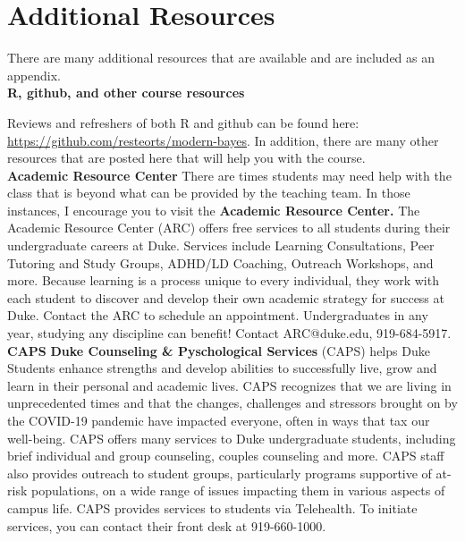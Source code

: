 \documentclass[11pt]{article}
\begin{document}
\clearpage
\newpage
\appendix

\section{Additional Resources}
There are many additional resources that are available and are included as an appendix. \\

\textbf{R, github, and other course resources}

Reviews and refreshers of both R and github can be found here: \url{https://github.com/resteorts/modern-bayes}. In addition, there are many other resources that are posted here that will help you with the course. \\


\textbf{Academic Resource Center} There are times students may need help with the class that is beyond what can be provided by the teaching team. In those instances, I encourage you to visit the \textbf{Academic Resource Center.} The Academic Resource Center (ARC) offers free services to all students during their undergraduate careers at Duke. Services include Learning Consultations, Peer Tutoring and Study Groups, ADHD/LD Coaching, Outreach Workshops, and more. Because learning is a process unique to every individual, they work with each student to discover and develop their own academic strategy for success at Duke. Contact the ARC to schedule an appointment. Undergraduates in any year, studying any discipline can benefit! Contact ARC@duke.edu, 919-684-5917.\\

\textbf{CAPS}
\textbf{Duke Counseling \& Pyschological Services} (CAPS) helps Duke Students enhance strengths and develop abilities to successfully live, grow and learn in their personal and academic lives. CAPS recognizes that we are living in unprecedented times and that the changes, challenges and stressors brought on by the COVID-19 pandemic have impacted everyone, often in ways that tax our well-being. CAPS offers many services to Duke undergraduate students, including brief individual and group counseling, couples counseling and more. CAPS staff also provides outreach to student groups, particularly programs supportive of at-risk populations, on a wide range of issues impacting them in various aspects of campus life. CAPS provides services to students via Telehealth. To initiate services, you can contact their front desk at 919-660-1000.\\
\end{document}
